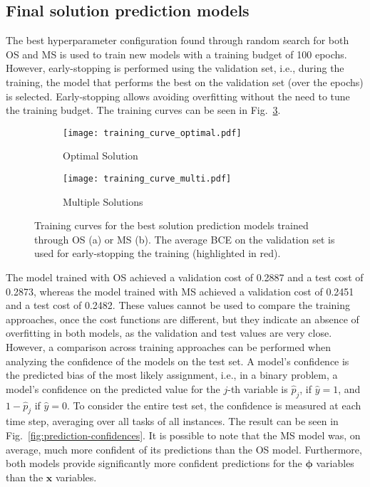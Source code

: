 \subsection{Final solution prediction models}

The best hyperparameter configuration found through random search for both OS and MS is used to train new models with a training budget of 100 epochs.
However, early-stopping is performed using the validation set, i.e., during the training, the model that performs the best on the validation set (over the epochs) is selected.
Early-stopping allows avoiding overfitting without the need to tune the training budget.
The training curves can be seen in Fig.~\ref{fig:opt-training-curves}.

\begin{figure}[h]
    \centering
    \begin{subfigure}{0.49\textwidth}
        \centering
        \texttt{[image: training\_curve\_optimal.pdf]}
        \caption{Optimal Solution}\label{fig:training-bs}
    \end{subfigure}
    \begin{subfigure}{0.49\textwidth}
        \centering
        \texttt{[image: training\_curve\_multi.pdf]}
        \caption{Multiple Solutions}\label{fig:training-ms}
    \end{subfigure}
    \caption{Training curves for the best solution prediction models trained through OS (a) or MS (b). The average BCE on the validation set is used for early-stopping the training (highlighted in red).}
    \label{fig:opt-training-curves}
\end{figure}

The model trained with OS achieved a validation cost of 0.2887 and a test cost of 0.2873, whereas the model trained with MS achieved a validation cost of 0.2451 and a test cost of 0.2482.
These values cannot be used to compare the training approaches, once the cost functions are different, but they indicate an absence of overfitting in both models, as the validation and test values are very close.
However, a comparison across training approaches can be performed when analyzing the confidence of the models on the test set.
A model's confidence is the predicted bias of the most likely assignment, i.e., in a binary problem, a model's confidence on the predicted value for the $j$-th variable is $\hat{p}_j$, if $\hat{y} = 1$, and $1-\hat{p}_j$ if $\hat{y}=0$.
To consider the entire test set, the confidence is measured at each time step, averaging over all tasks of all instances.
The result can be seen in Fig.~\ref{fig:prediction-confidences}.
It is possible to note that the MS model was, on average, much more confident of its predictions than the OS model.
Furthermore, both models provide significantly more confident predictions for the $\bm{\phi}$ variables than the $\bm{x}$ variables.


